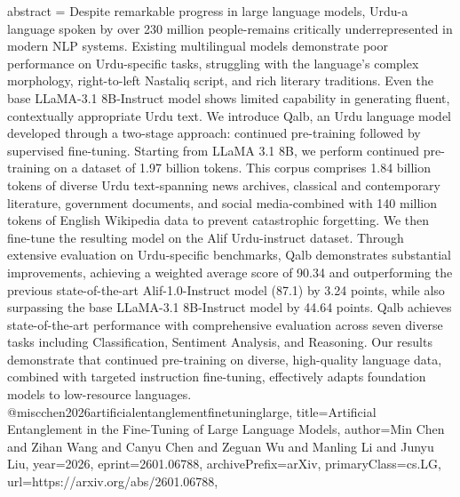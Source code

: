 {      abstract = {Despite remarkable progress in large language models, Urdu-a language spoken by over 230 million people-remains critically underrepresented in modern NLP systems. Existing multilingual models demonstrate poor performance on Urdu-specific tasks, struggling with the language's complex morphology, right-to-left Nastaliq script, and rich literary traditions. Even the base LLaMA-3.1 8B-Instruct model shows limited capability in generating fluent, contextually appropriate Urdu text. We introduce Qalb, an Urdu language model developed through a two-stage approach: continued pre-training followed by supervised fine-tuning. Starting from LLaMA 3.1 8B, we perform continued pre-training on a dataset of 1.97 billion tokens. This corpus comprises 1.84 billion tokens of diverse Urdu text-spanning news archives, classical and contemporary literature, government documents, and social media-combined with 140 million tokens of English Wikipedia data to prevent catastrophic forgetting. We then fine-tune the resulting model on the Alif Urdu-instruct dataset. Through extensive evaluation on Urdu-specific benchmarks, Qalb demonstrates substantial improvements, achieving a weighted average score of 90.34 and outperforming the previous state-of-the-art Alif-1.0-Instruct model (87.1) by 3.24 points, while also surpassing the base LLaMA-3.1 8B-Instruct model by 44.64 points. Qalb achieves state-of-the-art performance with comprehensive evaluation across seven diverse tasks including Classification, Sentiment Analysis, and Reasoning. Our results demonstrate that continued pre-training on diverse, high-quality language data, combined with targeted instruction fine-tuning, effectively adapts foundation models to low-resource languages.}
}@misc{chen2026artificialentanglementfinetuninglarge,
      title={Artificial Entanglement in the Fine-Tuning of Large Language Models}, 
      author={Min Chen and Zihan Wang and Canyu Chen and Zeguan Wu and Manling Li and Junyu Liu},
      year={2026},
      eprint={2601.06788},
      archivePrefix={arXiv},
      primaryClass={cs.LG},
      url={https://arxiv.org/abs/2601.06788},
}
